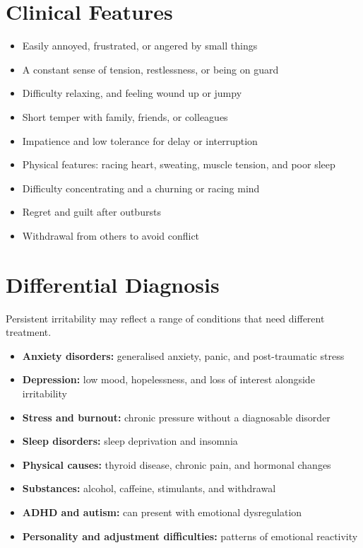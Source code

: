 \section*{Clinical Features}
\begin{itemize}
    \item Easily annoyed, frustrated, or angered by small things
    \item A constant sense of tension, restlessness, or being on guard
    \item Difficulty relaxing, and feeling wound up or jumpy
    \item Short temper with family, friends, or colleagues
    \item Impatience and low tolerance for delay or interruption
    \item Physical features: racing heart, sweating, muscle tension, and poor sleep
    \item Difficulty concentrating and a churning or racing mind
    \item Regret and guilt after outbursts
    \item Withdrawal from others to avoid conflict
\end{itemize}

\section*{Differential Diagnosis}
Persistent irritability may reflect a range of conditions that need different treatment.
\begin{itemize}
    \item \textbf{Anxiety disorders:} generalised anxiety, panic, and post-traumatic stress
    \item \textbf{Depression:} low mood, hopelessness, and loss of interest alongside irritability
    \item \textbf{Stress and burnout:} chronic pressure without a diagnosable disorder
    \item \textbf{Sleep disorders:} sleep deprivation and insomnia
    \item \textbf{Physical causes:} thyroid disease, chronic pain, and hormonal changes
    \item \textbf{Substances:} alcohol, caffeine, stimulants, and withdrawal
    \item \textbf{ADHD and autism:} can present with emotional dysregulation
    \item \textbf{Personality and adjustment difficulties:} patterns of emotional reactivity
\end{itemize}

